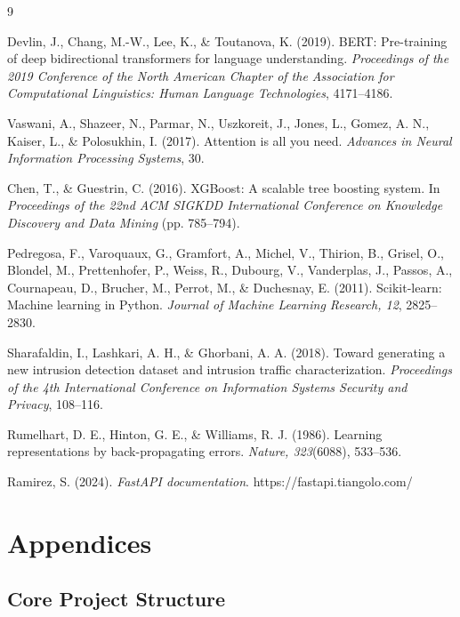 \documentclass[12pt,a4paper]{article}
\begin{document}
\begin{thebibliography}{9}

Devlin, J., Chang, M.-W., Lee, K., \& Toutanova, K. (2019). BERT: Pre-training of deep bidirectional transformers for language understanding. \textit{Proceedings of the 2019 Conference of the North American Chapter of the Association for Computational Linguistics: Human Language Technologies}, 4171--4186.

Vaswani, A., Shazeer, N., Parmar, N., Uszkoreit, J., Jones, L., Gomez, A. N., Kaiser, L., \& Polosukhin, I. (2017). Attention is all you need. \textit{Advances in Neural Information Processing Systems}, 30.

Chen, T., \& Guestrin, C. (2016). XGBoost: A scalable tree boosting system. In \textit{Proceedings of the 22nd ACM SIGKDD International Conference on Knowledge Discovery and Data Mining} (pp. 785--794).

Pedregosa, F., Varoquaux, G., Gramfort, A., Michel, V., Thirion, B., Grisel, O., Blondel, M., Prettenhofer, P., Weiss, R., Dubourg, V., Vanderplas, J., Passos, A., Cournapeau, D., Brucher, M., Perrot, M., \& Duchesnay, E. (2011). Scikit-learn: Machine learning in Python. \textit{Journal of Machine Learning Research, 12}, 2825--2830.

Sharafaldin, I., Lashkari, A. H., \& Ghorbani, A. A. (2018). Toward generating a new intrusion detection dataset and intrusion traffic characterization. \textit{Proceedings of the 4th International Conference on Information Systems Security and Privacy}, 108--116.

Rumelhart, D. E., Hinton, G. E., \& Williams, R. J. (1986). Learning representations by back-propagating errors. \textit{Nature, 323}(6088), 533--536.

Ramirez, S. (2024). \textit{FastAPI documentation}. https://fastapi.tiangolo.com/

\end{thebibliography}

\appendix
\section{Appendices}

\subsection{Core Project Structure}
\end{document}

